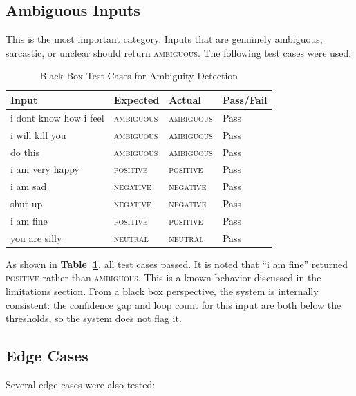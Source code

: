 \subsection{Ambiguous Inputs}

This is the most important category. Inputs that are genuinely ambiguous, sarcastic, or unclear
should return \textsc{ambiguous}. The following test cases were used:

\begin{table}[H]
\centering
\caption{Black Box Test Cases for Ambiguity Detection}
\label{tab:blackbox}
\begin{tabular}{llll}
\toprule
\textbf{Input} & \textbf{Expected} & \textbf{Actual} & \textbf{Pass/Fail} \\
\midrule
i dont know how i feel & \textsc{ambiguous} & \textsc{ambiguous} & Pass \\
i will kill you        & \textsc{ambiguous} & \textsc{ambiguous} & Pass \\
do this                & \textsc{ambiguous} & \textsc{ambiguous} & Pass \\
i am very happy        & \textsc{positive}  & \textsc{positive}  & Pass \\
i am sad               & \textsc{negative}  & \textsc{negative}  & Pass \\
shut up                & \textsc{negative}  & \textsc{negative}  & Pass \\
i am fine              & \textsc{positive}  & \textsc{positive}  & Pass \\
you are silly          & \textsc{neutral}   & \textsc{neutral}   & Pass \\
\bottomrule
\end{tabular}
\end{table}

As shown in \textbf{Table~\ref{tab:blackbox}}, all test cases passed. It is noted that ``i am fine''
returned \textsc{positive} rather than \textsc{ambiguous}. This is a known behavior discussed
in the limitations section. From a black box perspective, the system is internally consistent:
the confidence gap and loop count for this input are both below the thresholds, so the system
does not flag it.

\subsection{Edge Cases}

Several edge cases were also tested:

